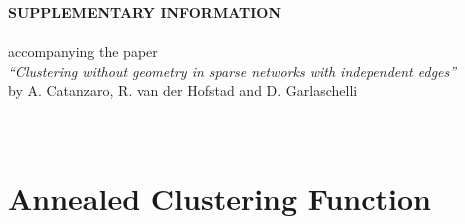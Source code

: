 \documentclass[ twocolumn,
 amsmath,amssymb,
 aps, pre, amsthm, amsfonts,
]{revtex4-2}
\begin{document}
\nocite{*}





%
%
\clearpage
\newpage
\setcounter{equation}{0}

\setcounter{figure}{0}
\setcounter{table}{0}
\setcounter{page}{1}
\setcounter{section}{0}

\renewcommand{\theequation}{S\arabic{equation}}
\renewcommand{\thetable}{S\arabic{table}}
\renewcommand{\thefigure}{S\arabic{figure}}
\renewcommand{\thesection}{S.\Roman{section}} 
\renewcommand{\thesubsection}{\thesection.\roman{subsection}}

\onecolumngrid
{\center
\textbf{SUPPLEMENTARY INFORMATION}\\
$\quad$\\
accompanying the paper\\
\emph{``Clustering without geometry in sparse networks with independent edges''}\\
by A. Catanzaro, R. van der Hofstad and D. Garlaschelli\\
$\quad$\\
$\quad$\\
}

    


\section{Annealed Clustering Function}
\label{app:firstMoments}
\end{document}
